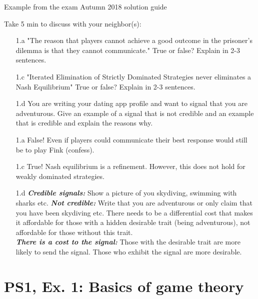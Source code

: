 \begin{frame}{Example from the exam Autumn 2018 solution guide}
\begin{multicols}{2}\color{lightgray}
  Take 5 min to discuss with your neighbor(s):
  \begin{itemize}\color{lightgray}
    \item[\color{lightgray}1.a] "The reason that players cannot achieve a good outcome in the prisoner’s dilemma is that they cannot communicate." True or false? Explain in 2-3 sentences.
    \item[\color{lightgray}1.c] "Iterated Elimination of Strictly Dominated Strategies never eliminates a Nash Equilibrium" True or false? Explain in 2-3 sentences.
    \item[1.d] \color{black}You are writing your dating app profile and want to signal that you are adventurous. Give an example of a signal that is not credible and an example that is credible and explain the reasons why.
  \end{itemize}
\vfill\null
\columnbreak
\begin{itemize}\color{lightgray}
  \item[\color{lightgray}1.a] False! Even if players could communicate their best response would still be to play Fink (confess).
  \item[\color{lightgray}1.c] True! Nash equilibrium is a refinement. However, this does not hold for
weakly dominated strategies.
  \item[1.d] \color{black}\textit{\textbf{Credible signals:}} Show a picture of you skydiving, swimming with
sharks etc. \textit{\textbf{Not credible:}} Write that you are adventurous or only claim that you
have been skydiving etc. There needs to be a differential cost that makes it affordable for those with a hidden desirable trait (being adventurous), not affordable for those without this trait.\\
\textit{\textbf{There is a cost to the signal:}} Those with the desirable trait are more likely to send the signal. Those who exhibit the signal are more desirable.
\end{itemize}
\end{multicols}
\end{frame}


\section{PS1, Ex. 1: Basics of game theory}

